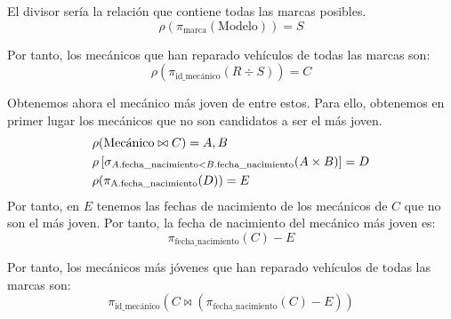 \begin{ejercicio}
\begin{enumerate}
        El divisor sería la relación que contiene todas las marcas posibles.
        \begin{equation*}
            \rho(\pi_{\text{marca}}(\text{Modelo})) = S
        \end{equation*}

        Por tanto, los mecánicos que han reparado vehículos de todas las marcas son:
        \begin{equation*}
            \rho(\pi_{\text{id\_mecánico}}(R \div S))=C
        \end{equation*}

        Obtenemos ahora el mecánico más joven de entre estos. Para ello,
        obtenemos en primer lugar los mecánicos que no son candidatos a ser el más joven.
        \begin{align*}
            & \rho(\text{Mecánico}\bowtie C) = A,B\\
            & \rho\left[\sigma_{A.\text{fecha\_nacimiento} < B.\text{fecha\_nacimiento}}(A \times B)\right] = D\\
            & \rho(\pi_{\text{A.\text{fecha\_nacimiento}}}(D)) = E
        \end{align*}
        Por tanto, en $E$ tenemos las fechas de nacimiento de los mecánicos de $C$ que no son el más joven.
        Por tanto, la fecha de nacimiento del mecánico más joven es:
        \begin{equation*}
            \pi_{\text{fecha\_nacimiento}}(C)-E
        \end{equation*}

        Por tanto, los mecánicos más jóvenes que han reparado vehículos de todas las marcas son:
        \begin{equation*}
            \pi_{\text{id\_mecánico}}(C\bowtie (\pi_{\text{fecha\_nacimiento}}(C)-E))
        \end{equation*}

    \end{enumerate}

\end{ejercicio}




